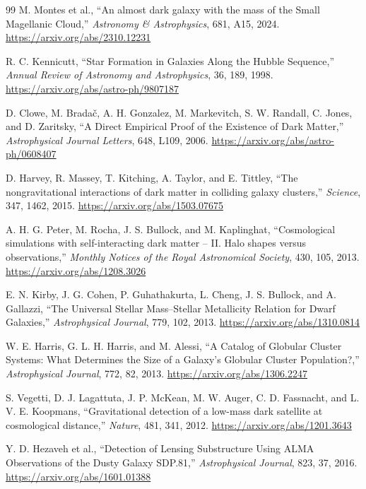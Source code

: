 \begin{thebibliography}{99}
M. Montes et al.,
``An almost dark galaxy with the mass of the Small Magellanic Cloud,''
\emph{Astronomy \& Astrophysics}, 681, A15, 2024.
\url{https://arxiv.org/abs/2310.12231}

R. C. Kennicutt,
``Star Formation in Galaxies Along the Hubble Sequence,''
\emph{Annual Review of Astronomy and Astrophysics}, 36, 189, 1998.
\url{https://arxiv.org/abs/astro-ph/9807187}

D. Clowe, M. Brada\v{c}, A. H. Gonzalez, M. Markevitch, S. W. Randall, C. Jones, and D. Zaritsky,
``A Direct Empirical Proof of the Existence of Dark Matter,''
\emph{Astrophysical Journal Letters}, 648, L109, 2006.
\url{https://arxiv.org/abs/astro-ph/0608407}

D. Harvey, R. Massey, T. Kitching, A. Taylor, and E. Tittley,
``The nongravitational interactions of dark matter in colliding galaxy clusters,''
\emph{Science}, 347, 1462, 2015.
\url{https://arxiv.org/abs/1503.07675}

A. H. G. Peter, M. Rocha, J. S. Bullock, and M. Kaplinghat,
``Cosmological simulations with self-interacting dark matter -- II. Halo shapes versus observations,''
\emph{Monthly Notices of the Royal Astronomical Society}, 430, 105, 2013.
\url{https://arxiv.org/abs/1208.3026}

E. N. Kirby, J. G. Cohen, P. Guhathakurta, L. Cheng, J. S. Bullock, and A. Gallazzi,
``The Universal Stellar Mass--Stellar Metallicity Relation for Dwarf Galaxies,''
\emph{Astrophysical Journal}, 779, 102, 2013.
\url{https://arxiv.org/abs/1310.0814}

W. E. Harris, G. L. H. Harris, and M. Alessi,
``A Catalog of Globular Cluster Systems: What Determines the Size of a Galaxy's Globular Cluster Population?,''
\emph{Astrophysical Journal}, 772, 82, 2013.
\url{https://arxiv.org/abs/1306.2247}

S. Vegetti, D. J. Lagattuta, J. P. McKean, M. W. Auger, C. D. Fassnacht, and L. V. E. Koopmans,
``Gravitational detection of a low-mass dark satellite at cosmological distance,''
\emph{Nature}, 481, 341, 2012.
\url{https://arxiv.org/abs/1201.3643}

Y. D. Hezaveh et al.,
``Detection of Lensing Substructure Using ALMA Observations of the Dusty Galaxy SDP.81,''
\emph{Astrophysical Journal}, 823, 37, 2016.
\url{https://arxiv.org/abs/1601.01388}


\end{thebibliography}
